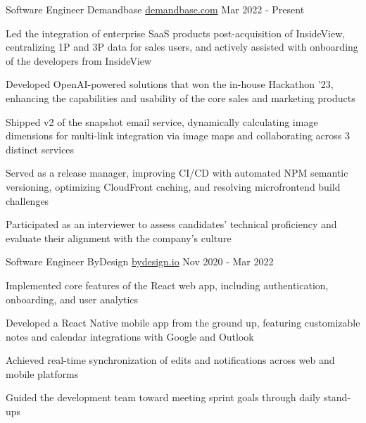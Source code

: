 

\begin{cventries}

\cventry
{Software Engineer} %
{Demandbase} %
{\href{https://www.demandbase.com/}{demandbase.com}} %
{Mar 2022 - Present} %
{
  \begin{cvitems} %
    \item {Led the integration of enterprise SaaS products post-acquisition of InsideView, centralizing 1P and 3P data for sales users, and actively assisted with onboarding of the developers from InsideView}
    \item {Developed OpenAI-powered solutions that won the in-house Hackathon '23, enhancing the capabilities and usability of the core sales and marketing products}
    \item {Shipped v2 of the snapshot email service, dynamically calculating image dimensions for multi-link integration via image maps and collaborating across 3 distinct services}
    \item {Served as a release manager, improving CI/CD with automated NPM semantic versioning, optimizing CloudFront caching, and resolving microfrontend build challenges}
    \item {Participated as an interviewer to assess candidates' technical proficiency and evaluate their alignment with the company's culture}
  \end{cvitems}
}

\cventry
{Software Engineer} %
{ByDesign} %
{\href{https://bydesign.io}{bydesign.io}} %
{Nov 2020 - Mar 2022} %
{
  \begin{cvitems} %
    \item {Implemented core features of the React web app, including authentication, onboarding, and user analytics}
    \item {Developed a React Native mobile app from the ground up, featuring customizable notes and calendar integrations with Google and Outlook}
    \item {Achieved real-time synchronization of edits and notifications across web and mobile platforms}
    \item {Guided the development team toward meeting sprint goals through daily stand-ups}
  \end{cvitems}
}


\end{cventries}
